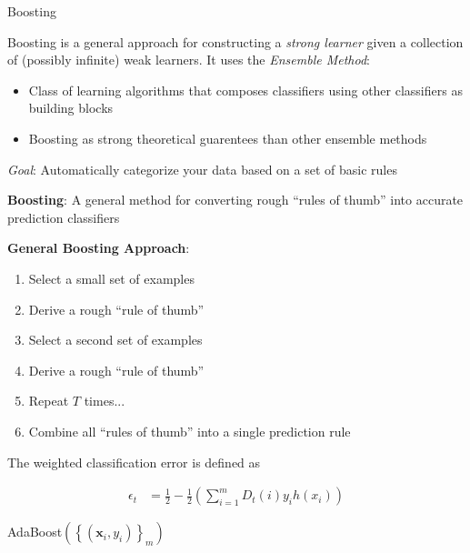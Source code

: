 \documentclass{article}
\begin{document}
{\large Boosting}

Boosting is a general approach for constructing a {\em strong learner} given a collection of (possibly infinite) weak learners. It uses the {\em Ensemble Method}:

\begin{itemize}
\item Class of learning algorithms that composes classifiers using other classifiers as building blocks
\item Boosting as strong theoretical guarentees than other ensemble methods
\end{itemize}

{\em Goal}: Automatically categorize your data based on a set of basic rules

{\bf Boosting}: A general method for converting rough ``rules of thumb'' into accurate prediction classifiers

{\bf General Boosting Approach}:
\begin{enumerate}
\item Select a small set of examples
\item Derive a rough ``rule of thumb''
\item Select a second set of examples
\item Derive a rough ``rule of thumb''
\item Repeat $T$ times...
\item Combine all ``rules of thumb'' into a single prediction rule
\end{enumerate}

The weighted classification error is defined as 

\begin{align}
\epsilon_{t} &= \frac{1}{2}-\frac{1}{2}\left(\sum_{i=1}^{m}D_{t}(i)y_{i}h(x_{i})\right)
\end{align}

\begin{algorithm}
\begin{algorithmic}
\ENDFOR
{}
\end{algorithmic}
\caption{AdaBoost$\left(\left\{(\mathbf{x}_{i},y_{i})\right\}_{m}\right)$}
\end{algorithm}
\end{document}
